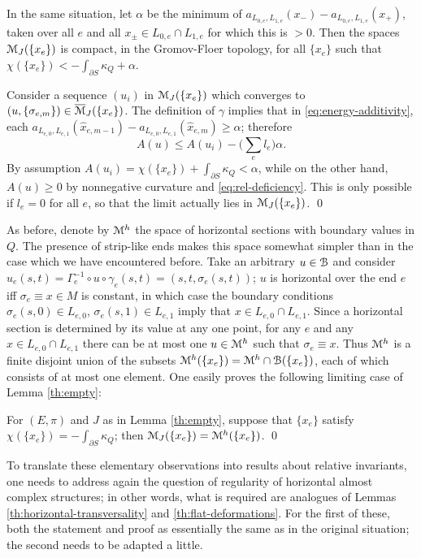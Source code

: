 \documentclass[10pt,letterpaper]{article}
\begin{document}
\begin{lemma} \label{th:energy-compactness}
In the same situation, let $\alpha$ be the minimum of $a_{L_{0,e},L_{1,e}}(x_-)
- a_{L_{0,e},L_{1,e}}(x_+)$, taken over all $e$ and all $x_{\pm} \in L_{0,e}
\cap L_{1,e}$ for which this is $>0$. Then the spaces $\mathcal{M}_J(\{x_e\})$ is
compact, in the Gromov-Floer topology, for all $\{x_e\}$ such that
$\chi(\{x_e\}) < -\int_{\partial S} \kappa_Q + \alpha$.
\end{lemma}

\proof Consider a sequence $(u_i)$ in $\mathcal{M}_J(\{x_e\})$ which converges to
$(u,\{\sigma_{e,m}\}) \in \overline{\mathcal{M}}_J(\{x_e\})$. The definition of
$\gamma$ implies that in \eqref{eq:energy-additivity}, each
$a_{L_{e,0},L_{e,1}}(\hat{x}_{e,m-1}) - a_{L_{e,0},L_{e,1}}(\hat{x}_{e,m}) \geq
\alpha$; therefore
\[
A(u) \leq A(u_i) - \big(\textstyle\sum_e l_e\big) \alpha.
\]
By assumption $A(u_i) = \chi(\{x_e\}) + \int_{\partial S} \kappa_Q < \alpha$,
while on the other hand, $A(u) \geq 0$ by nonnegative curvature and
\eqref{eq:rel-deficiency}. This is only possible if $l_e = 0$ for all $e$, so
that the limit actually lies in $\mathcal{M}_J(\{x_e\})$. \qed

As before, denote by $\mathcal{M}^h$ the space of horizontal sections with boundary
values in $Q$. The presence of strip-like ends makes this space somewhat
simpler than in the case which we have encountered before. Take an arbitrary $u
\in \mathcal{B}$ and consider $u_e(s,t) = \Gamma_e^{-1} \circ u \circ \gamma_e(s,t) =
(s,t,\sigma_e(s,t))$; $u$ is horizontal over the end $e$ iff $\sigma_e \equiv x
\in M$ is constant, in which case the boundary conditions $\sigma_e(s,0) \in
L_{e,0}$, $\sigma_e(s,1) \in L_{e,1}$ imply that $x \in L_{e,0} \cap L_{e,1}$.
Since a horizontal section is determined by its value at any one point, for any
$e$ and any $x \in L_{e,0} \cap L_{e,1}$ there can be at most one $u \in \mathcal{M}^h$
such that $\sigma_e \equiv x$. Thus $\mathcal{M}^h$ is a finite disjoint union of the
subsets $\mathcal{M}^h(\{x_e\}) = \mathcal{M}^h \cap \mathcal{B}(\{x_e\})$, each of which consists of
at most one element. One easily proves the following limiting case of Lemma
\ref{th:empty}:

\begin{lemma} \label{th:almost-empty}
For $(E,\pi)$ and $J$ as in Lemma \ref{th:empty}, suppose that $\{x_e\}$
satisfy $\chi(\{x_e\}) = -\int_{\partial S} \kappa_Q$; then $\mathcal{M}_J(\{x_e\}) =
\mathcal{M}^h(\{x_e\})$. \qed
\end{lemma}

To translate these elementary observations into results about relative
invariants, one needs to address again the question of regularity of horizontal
almost complex structures; in other words, what is required are analogues of
Lemmas \ref{th:horizontal-transversality} and \ref{th:flat-deformations}. For
the first of these, both the statement and proof as essentially the same as in
the original situation; the second needs to be adapted a little.
\end{document}
